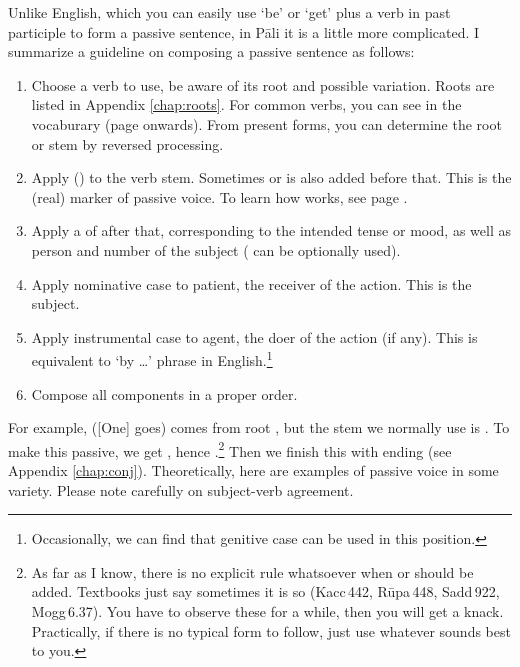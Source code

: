 Unlike English, which you can easily use `be' or `get' plus a verb in past participle to form a passive sentence, in P\=ali it is a little more complicated. I summarize a guideline on composing a passive sentence as follows:
\begin{enumerate}
\item Choose a verb to use, be aware of its root and possible variation. Roots are listed in Appendix \ref{chap:roots}. For common verbs, you can see in the vocaburary (page \pageref{vocab:verb} onwards). From present forms, you can determine the root or stem by reversed processing.
\item Apply  () to the verb stem. Sometimes  or  is also added before that. This is the (real) marker of passive voice. To learn how  works, see page \pageref{pacca:ya2}.
\item Apply a  of  after that, corresponding to the intended tense or mood, as well as person and number of the subject ( can be optionally used).
\item Apply nominative case to patient, the receiver of the action. This is the subject.
\item Apply instrumental case to agent, the doer of the action (if any). This is equivalent to `by \ldots' phrase in English.\footnote{Occasionally, we can find that genitive case can be used in this position.}
\item Compose all components in a proper order.
\end{enumerate}

For example,  ([One] goes) comes from root , but the stem we normally use is . To make this passive, we get , hence .\footnote{As far as I know, there is no explicit rule whatsoever when  or  should be added. Textbooks just say sometimes it is so (Kacc\,442, R\=upa\,448, Sadd\,922, Mogg\,6.37). You have to observe these for a while, then you will get a knack. Practically, if there is no typical form to follow, just use whatever sounds best to you.} Then we finish this with  ending (see Appendix \ref{chap:conj}). Theoretically, here are examples of passive voice in some variety. Please note carefully on subject-verb agreement.

